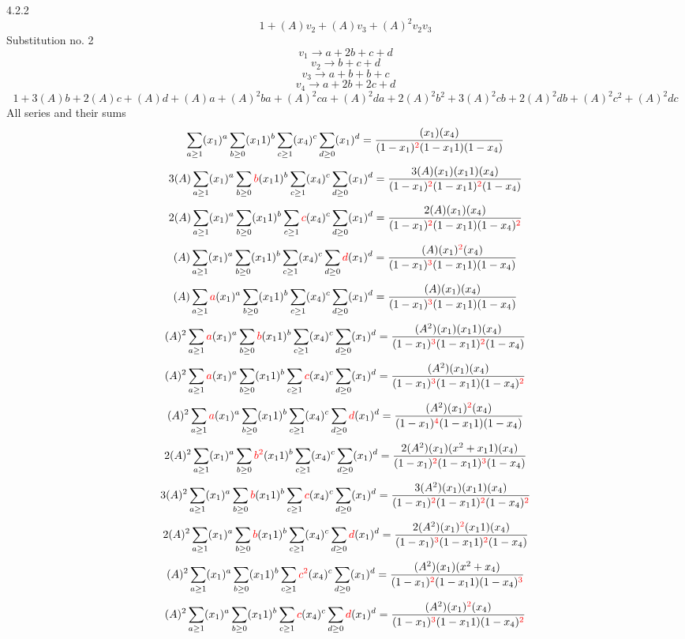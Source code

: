 \documentclass{article}
\begin{document}
4.2.2
\[1+(A)v_2+(A)v_3+(A)^2v_2v_3\]Substitution no. 2\[v_1\rightarrow{a+2b+c+d}\]\[v_2\rightarrow{b+c+d}\]\[v_3\rightarrow{a+b+b+c}\]\[v_4\rightarrow{a+2b+2c+d}\]\[1+3(A)b+2(A)c+(A)d+(A)a+(A)^2ba+(A)^2ca+(A)^2da+2(A)^2b^{2}+3(A)^2cb+2(A)^2db+(A)^2c^{2}+(A)^2dc\]All series and their sums\[\sum_{a\geq{1}}(x_1)^{a}\sum_{b\geq{0}}(x_11)^{b}\sum_{c\geq{1}}(x_4)^{c}\sum_{d\geq{0}}(x_1)^{d}=\frac{(x_1)(x_4)}{(1-x_1)^{\textcolor{red}{2}}(1-x_11)(1-x_4)}\]\[3(A)\sum_{a\geq{1}}(x_1)^{a}\sum_{b\geq{0}}\textcolor{red}{b}(x_11)^{b}\sum_{c\geq{1}}(x_4)^{c}\sum_{d\geq{0}}(x_1)^{d}=\frac{3(A)(x_1)(x_11)(x_4)}{(1-x_1)^{\textcolor{red}{2}}(1-x_11)^{\textcolor{red}{2}}(1-x_4)}\]\[2(A)\sum_{a\geq{1}}(x_1)^{a}\sum_{b\geq{0}}(x_11)^{b}\sum_{c\geq{1}}\textcolor{red}{c}(x_4)^{c}\sum_{d\geq{0}}(x_1)^{d}=\frac{2(A)(x_1)(x_4)}{(1-x_1)^{\textcolor{red}{2}}(1-x_11)(1-x_4)^{\textcolor{red}{2}}}\]\[(A)\sum_{a\geq{1}}(x_1)^{a}\sum_{b\geq{0}}(x_11)^{b}\sum_{c\geq{1}}(x_4)^{c}\sum_{d\geq{0}}\textcolor{red}{d}(x_1)^{d}=\frac{(A)(x_1)^{\textcolor{red}{2}}(x_4)}{(1-x_1)^{\textcolor{red}{3}}(1-x_11)(1-x_4)}\]\[(A)\sum_{a\geq{1}}\textcolor{red}{a}(x_1)^{a}\sum_{b\geq{0}}(x_11)^{b}\sum_{c\geq{1}}(x_4)^{c}\sum_{d\geq{0}}(x_1)^{d}=\frac{(A)(x_1)(x_4)}{(1-x_1)^{\textcolor{red}{3}}(1-x_11)(1-x_4)}\]\[(A)^{2}\sum_{a\geq{1}}\textcolor{red}{a}(x_1)^{a}\sum_{b\geq{0}}\textcolor{red}{b}(x_11)^{b}\sum_{c\geq{1}}(x_4)^{c}\sum_{d\geq{0}}(x_1)^{d}=\frac{(A^{2})(x_1)(x_11)(x_4)}{(1-x_1)^{\textcolor{red}{3}}(1-x_11)^{\textcolor{red}{2}}(1-x_4)}\]\[(A)^{2}\sum_{a\geq{1}}\textcolor{red}{a}(x_1)^{a}\sum_{b\geq{0}}(x_11)^{b}\sum_{c\geq{1}}\textcolor{red}{c}(x_4)^{c}\sum_{d\geq{0}}(x_1)^{d}=\frac{(A^{2})(x_1)(x_4)}{(1-x_1)^{\textcolor{red}{3}}(1-x_11)(1-x_4)^{\textcolor{red}{2}}}\]\[(A)^{2}\sum_{a\geq{1}}\textcolor{red}{a}(x_1)^{a}\sum_{b\geq{0}}(x_11)^{b}\sum_{c\geq{1}}(x_4)^{c}\sum_{d\geq{0}}\textcolor{red}{d}(x_1)^{d}=\frac{(A^{2})(x_1)^{\textcolor{red}{2}}(x_4)}{(1-x_1)^{\textcolor{red}{4}}(1-x_11)(1-x_4)}\]\[2(A)^{2}\sum_{a\geq{1}}(x_1)^{a}\sum_{b\geq{0}}\textcolor{red}{b^{2}}(x_11)^{b}\sum_{c\geq{1}}(x_4)^{c}\sum_{d\geq{0}}(x_1)^{d}=\frac{2(A^{2})(x_1)(x^{2}+x_11)(x_4)}{(1-x_1)^{\textcolor{red}{2}}(1-x_11)^{\textcolor{red}{3}}(1-x_4)}\]\[3(A)^{2}\sum_{a\geq{1}}(x_1)^{a}\sum_{b\geq{0}}\textcolor{red}{b}(x_11)^{b}\sum_{c\geq{1}}\textcolor{red}{c}(x_4)^{c}\sum_{d\geq{0}}(x_1)^{d}=\frac{3(A^{2})(x_1)(x_11)(x_4)}{(1-x_1)^{\textcolor{red}{2}}(1-x_11)^{\textcolor{red}{2}}(1-x_4)^{\textcolor{red}{2}}}\]\[2(A)^{2}\sum_{a\geq{1}}(x_1)^{a}\sum_{b\geq{0}}\textcolor{red}{b}(x_11)^{b}\sum_{c\geq{1}}(x_4)^{c}\sum_{d\geq{0}}\textcolor{red}{d}(x_1)^{d}=\frac{2(A^{2})(x_1)^{\textcolor{red}{2}}(x_11)(x_4)}{(1-x_1)^{\textcolor{red}{3}}(1-x_11)^{\textcolor{red}{2}}(1-x_4)}\]\[(A)^{2}\sum_{a\geq{1}}(x_1)^{a}\sum_{b\geq{0}}(x_11)^{b}\sum_{c\geq{1}}\textcolor{red}{c^{2}}(x_4)^{c}\sum_{d\geq{0}}(x_1)^{d}=\frac{(A^{2})(x_1)(x^{2}+x_4)}{(1-x_1)^{\textcolor{red}{2}}(1-x_11)(1-x_4)^{\textcolor{red}{3}}}\]\[(A)^{2}\sum_{a\geq{1}}(x_1)^{a}\sum_{b\geq{0}}(x_11)^{b}\sum_{c\geq{1}}\textcolor{red}{c}(x_4)^{c}\sum_{d\geq{0}}\textcolor{red}{d}(x_1)^{d}=\frac{(A^{2})(x_1)^{\textcolor{red}{2}}(x_4)}{(1-x_1)^{\textcolor{red}{3}}(1-x_11)(1-x_4)^{\textcolor{red}{2}}}\]
\end{document}
